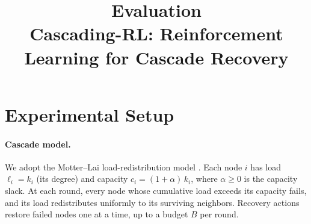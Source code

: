 \documentclass[11pt]{article}
\title{\textbf{Evaluation}\\[4pt]
       \large Cascading-RL: Reinforcement Learning for Cascade Recovery}
\author{}
\date{}
\begin{document}
\maketitle

\section{Experimental Setup}
\label{sec:setup}

\paragraph{Cascade model.}
We adopt the Motter--Lai load-redistribution model
\citep{motter2002cascade}.
Each node $i$ has load $\ell_i = k_i$ (its degree) and capacity
$c_i = (1+\alpha)\,k_i$, where $\alpha \geq 0$ is the capacity slack.
At each round, every node whose cumulative load exceeds its capacity fails,
and its load redistributes uniformly to its surviving neighbors.
Recovery actions restore failed nodes one at a time, up to a budget $B$ per
round.
\end{document}
